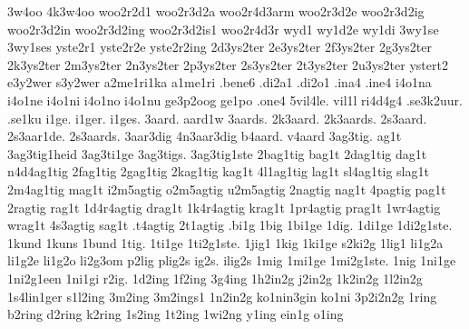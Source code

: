 {%
3w4oo
4k3w4oo
woo2r2d1
woo2r3d2a
woo2r4d3arm
woo2r3d2e
woo2r3d2ig
woo2r3d2in
woo2r3d2ing
woo2r3d2is1
woo2r4d3r
%
wyd1
wy1d2e
wy1di
%
3wy1se
3wy1ses
%
yste2r1
yste2r2e
yste2r2ing
2d3ys2ter
2e3ys2ter
2f3ys2ter
2g3ys2ter
2k3ys2ter
2m3ys2ter
2n3ys2ter
2p3ys2ter
2s3ys2ter
2t3ys2ter
2u3ys2ter
ystert2
%
%
e3y2wer
s3y2wer
%
%
a2me1ri1ka
a1me1ri
%
.bene6
.di2a1
.di2o1
.ina4
.ine4
i4o1na
i4o1ne
i4o1ni
i4o1no
i4o1nu
ge3p2oog
ge1po
.one4
5vil4le.
vil1l
ri4d4g4
%
.se3k2uur.
.se1ku
%
%
i1ge.
i1ger.
i1ges.
3aard.
aard1w
3aards.
2k3aard.
2k3aards.
2s3aard.
2s3aar1de.
2s3aards.
3aar3dig
4n3aar3dig
b4aard.
v4aard
%
3ag3tig.
ag1t
3ag3tig1heid
3ag3ti1ge
3ag3tigs.
3ag3tig1ste
%
2bag1tig
bag1t
2dag1tig
dag1t
n4d4ag1tig
2fag1tig
2gag1tig
2kag1tig
kag1t
4l1ag1tig
lag1t
sl4ag1tig
slag1t
2m4ag1tig
mag1t
i2m5agtig
o2m5agtig
u2m5agtig
%
2nagtig
nag1t
4pagtig
pag1t
2ragtig
rag1t
1d4r4agtig
drag1t
1k4r4agtig
krag1t
1pr4agtig
prag1t
1wr4agtig
wrag1t
4s3agtig
sag1t
.t4agtig
2t1agtig
%
%
.bi1g
1big
1bi1ge
%
1dig.
1di1ge
1di2g1ste.
%
1kund
1kuns
1bund
%
1tig.
1ti1ge
1ti2g1ste.
%
1jig1
%
1kig
1ki1ge
s2ki2g
%
1lig1
li1g2a
li1g2e
li1g2o
li2g3om
p2lig
plig2s
ig2s.
ilig2s
%
1mig
1mi1ge
1mi2g1ste.
%
1nig
1ni1ge
1ni2g1een
1ni1gi
%
r2ig.
%
1d2ing
1f2ing
3g4ing
%
1h2in2g
j2in2g
1k2in2g
1l2in2g
1s4lin1ger
s1l2ing
3m2ing
3m2ings1
1n2in2g
ko1nin3gin
ko1ni
3p2i2n2g
1ring
b2ring
d2ring
k2ring
1s2ing
1t2ing
1wi2ng
y1ing
%
ein1g
o1ing
}
